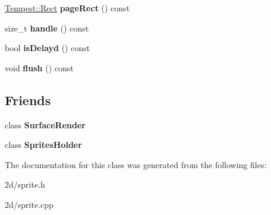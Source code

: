\begin{DoxyCompactItemize}
\item 
\hypertarget{class_tempest_1_1_sprite_afaade33a8ed9f0e9181f423adb02ce93}{\hyperlink{struct_tempest_1_1_rect}{Tempest\+::\+Rect} {\bfseries page\+Rect} () const }\label{class_tempest_1_1_sprite_afaade33a8ed9f0e9181f423adb02ce93}

\item 
\hypertarget{class_tempest_1_1_sprite_a84438fe4306402e778c214e99c4fa5b3}{size\+\_\+t {\bfseries handle} () const }\label{class_tempest_1_1_sprite_a84438fe4306402e778c214e99c4fa5b3}

\item 
\hypertarget{class_tempest_1_1_sprite_ab093b2740289ed7e4dc9e3dc4b847b02}{bool {\bfseries is\+Delayd} () const }\label{class_tempest_1_1_sprite_ab093b2740289ed7e4dc9e3dc4b847b02}

\item 
\hypertarget{class_tempest_1_1_sprite_a4cc8170455a4fc7ddc95c2d67ebe429a}{void {\bfseries flush} () const }\label{class_tempest_1_1_sprite_a4cc8170455a4fc7ddc95c2d67ebe429a}

\end{DoxyCompactItemize}
\subsection*{Friends}
\begin{DoxyCompactItemize}
\item 
\hypertarget{class_tempest_1_1_sprite_a9b082801c8cd4fe4c994d21e1fad565c}{class {\bfseries Surface\+Render}}\label{class_tempest_1_1_sprite_a9b082801c8cd4fe4c994d21e1fad565c}

\item 
\hypertarget{class_tempest_1_1_sprite_ade46db593c1d03836c4eae7df3bcdc83}{class {\bfseries Sprites\+Holder}}\label{class_tempest_1_1_sprite_ade46db593c1d03836c4eae7df3bcdc83}

\end{DoxyCompactItemize}


The documentation for this class was generated from the following files\+:\begin{DoxyCompactItemize}
\item 
2d/sprite.\+h\item 
2d/sprite.\+cpp\end{DoxyCompactItemize}
